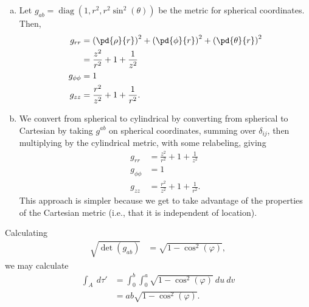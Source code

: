 \documentclass[10pt]{mypackage}
\begin{document}
\begin{solution}[30.16]\hfill
  \begin{enumerate}[(a)]
    \item Let $g_{ab} = \operatorname{diag}\left( 1,r^2,r^2\sin^2\left( \theta \right) \right)$ be the metric for spherical coordinates. Then,
      \begin{align*}
        g_{rr} &= \left( \pd{\rho}{r} \right)^2 + \left( \pd{\phi}{r} \right)^2 + \left( \pd{\theta}{r} \right)^2\\
               &= \frac{z^2}{r^2} + 1 + \frac{1}{z^2}\\
        g_{\phi\phi} &= 1\\
        g_{zz} &= \frac{r^2}{z^2} + 1 + \frac{1}{r^2}.
      \end{align*}
    \item We convert from spherical to cylindrical by converting from spherical to Cartesian by taking $g^{ab}$ on spherical coordinates, summing over $\delta_{ij}$, then multiplying by the cylindrical metric, with some relabeling, giving
      \begin{align*}
        g_{rr} &= \frac{z^2}{r^2} + 1 + \frac{1}{z^2}\\
        g_{\phi\phi} &= 1\\
        g_{zz} &= \frac{r^2}{z^2} + 1 + \frac{1}{r^2}.
      \end{align*}
      This approach is simpler because we get to take advantage of the properties of the Cartesian metric (i.e., that it is independent of location).
  \end{enumerate}
\end{solution}
\begin{solution}[30.20]
  Calculating
  \begin{align*}
    \sqrt{\det\left( g_{ab} \right)} &= \sqrt{1-\cos^2\left( \varphi \right)},
  \end{align*}
  we may calculate
  \begin{align*}
    \int_{A}^{} \:d\tau' &= \int_{0}^{b}\int_{0}^{a} \sqrt{1-\cos^2\left( \varphi \right)}\:du\:dv\\
                         &= ab\sqrt{1-\cos^2\left( \varphi \right)}.
  \end{align*}
\end{solution}
\end{document}
